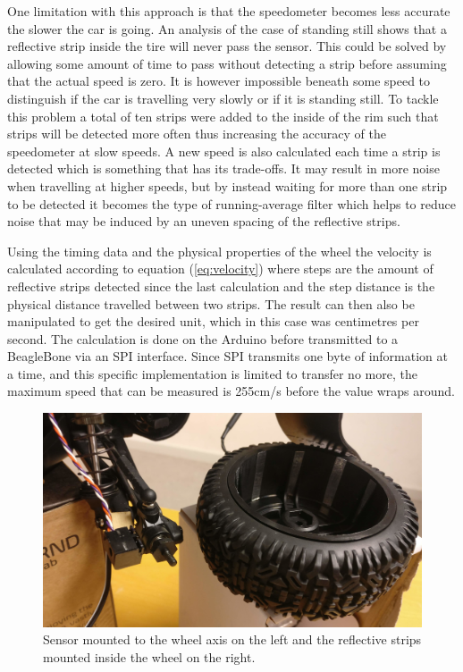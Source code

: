 \documentclass[11pt, titlepage]{article} %
\begin{document}
One limitation with this approach is that the speedometer becomes less accurate the slower the car is going. An analysis of the case of standing still shows that a reflective strip inside the tire will never pass the sensor. This could be solved by allowing some amount of time to pass without detecting a strip before assuming that the actual speed is zero. It is however impossible beneath some speed to distinguish if the car is travelling very slowly or if it is standing still. To tackle this problem a total of ten strips were added to the inside of the rim such that strips will be detected more often thus increasing the accuracy of the speedometer at slow speeds. A new speed is also calculated each time a strip is detected which is something that has its trade-offs. It may result in more noise when travelling at higher speeds, but by instead waiting for more than one strip to be detected it becomes the type of running-average filter which helps to reduce noise that may be induced by an uneven spacing of the reflective strips.

Using the timing data and the physical properties of the wheel the velocity is calculated according to equation (\ref{eq:velocity}) where steps are the amount of reflective strips detected since the last calculation and the step distance is the physical distance travelled between two strips. The result can then also be manipulated to get the desired unit, which in this case was centimetres per second. The calculation is done on the Arduino before transmitted to a BeagleBone via an SPI interface. Since SPI transmits one byte of information at a time, and this specific implementation is limited to transfer no more, the maximum speed that can be measured is 255cm/s before the value wraps around.

\begin{figure}[]
	\centering
   	\includegraphics[scale=0.5]{speedometer.jpg}
   	\caption{Sensor mounted to the wheel axis on the left and the reflective strips mounted inside the wheel on the right.}
    \label{fig:speedometer}
\end{figure}
\end{document}
